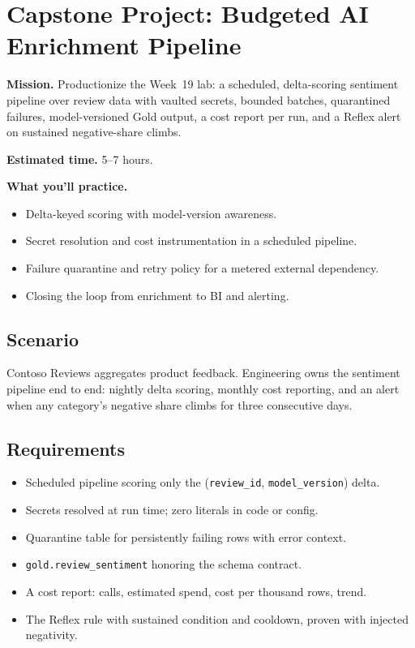 \section{Capstone Project: Budgeted AI Enrichment Pipeline}\label{sec:ch19-capstone}

\begin{capstonebox}
\textbf{Mission.} Productionize the Week~19 lab: a scheduled, delta-scoring sentiment pipeline over review data with vaulted secrets, bounded batches, quarantined failures, model-versioned Gold output, a cost report per run, and a Reflex alert on sustained negative-share climbs.

\textbf{Estimated time.} 5--7 hours.

\textbf{What you'll practice.}
\begin{itemize}
    \item Delta-keyed scoring with model-version awareness.
    \item Secret resolution and cost instrumentation in a scheduled pipeline.
    \item Failure quarantine and retry policy for a metered external dependency.
    \item Closing the loop from enrichment to BI and alerting.
\end{itemize}
\end{capstonebox}

\subsection*{Scenario}
Contoso Reviews aggregates product feedback. Engineering owns the sentiment pipeline end to end: nightly delta scoring, monthly cost reporting, and an alert when any category's negative share climbs for three consecutive days.

\subsection*{Requirements}
\begin{itemize}
    \item Scheduled pipeline scoring only the (\texttt{review\_id}, \texttt{model\_version}) delta.
    \item Secrets resolved at run time; zero literals in code or config.
    \item Quarantine table for persistently failing rows with error context.
    \item \texttt{gold.review\_sentiment} honoring the schema contract.
    \item A cost report: calls, estimated spend, cost per thousand rows, trend.
    \item The Reflex rule with sustained condition and cooldown, proven with injected negativity.
\end{itemize}

